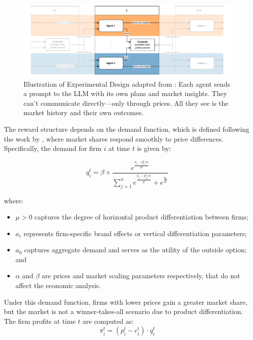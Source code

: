 \begin{figure}[htpb!]
  \centering
  \includegraphics[width=1\linewidth]{latex/imgs/illustration_diagram_experiment.pdf}
    \caption{Illustration of Experimental Design adapted from \textcite[p. 9]{fish_algorithmic_2025}: Each agent sends a prompt to the LLM with its own plans and market insights. They can't communicate directly—only through prices. All they see is the market history and their own outcomes.}
    \label{fig:experimental_design}
\end{figure}

The reward structure depends on the demand function, which is defined following the work by \textcite{calvano_artificial_2020}, where market shares respond smoothly to price differences. Specifically, the demand for firm $i$ at time $t$ is given by:

\begin{equation}\label{eq:calvano}
    q_i^t = \beta \times \frac{e^{\frac{a_i - p_i^t/\alpha}{\mu}}}{\sum_{j=1}^{n} e^{\frac{a_j - p_j^t/\alpha}{\mu}} + e^{\frac{a_0}{\mu}}}
\end{equation}

where:
\begin{itemize}[noitemsep]
    \item $\mu > 0$ captures the degree of horizontal product differentiation between firms;
    \item $a_i$ represents firm-specific brand effects or vertical differentiation parameters;
    \item $a_0$ captures aggregate demand and serves as the utility of the outside option; and
    \item $\alpha$ and $\beta$ are prices and market scaling parameters respectively, that do not affect the economic analysis.
\end{itemize}

Under this demand function, firms with lower prices gain a greater market share, but the market is not a winner-takes-all scenario due to product differentiation. The firm profits at time $t$ are computed as: 
\begin{equation}
    \pi_i^t = (p_i^t - c_i^t) \cdot q_i^t
\end{equation}


